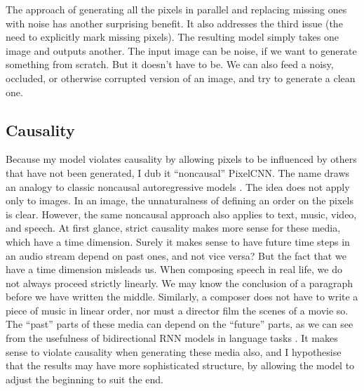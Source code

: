 \documentclass[10pt,a4paper]{article}
\newcommand{\nquote}[1]{``{#1}''}
\begin{document}
The approach of generating all the pixels in parallel and replacing missing ones with noise has another surprising benefit. It also addresses the third issue (the need to explicitly mark missing pixels). The resulting model simply takes one image and outputs another. The input image can be noise, if we want to generate something from scratch. But it doesn't have to be. We can also feed a noisy, occluded, or otherwise corrupted version of an image, and try to generate a clean one.

\subsection{Causality}

Because my model violates causality by allowing pixels to be influenced by others that have not been generated, I dub it \nquote{noncausal} PixelCNN. The name draws an analogy to classic noncausal autoregressive models \citep{noncausalimage2,noncausaleco2}. The idea does not apply only to images. In an image, the unnaturalness of defining an order on the pixels is clear. However, the same noncausal approach also applies to text, music, video, and speech. At first glance, strict causality makes more sense for these media, which have a time dimension. Surely it makes sense to have future time steps in an audio stream depend on past ones, and not vice versa? But the fact that we have a time dimension misleads us. When composing speech in real life, we do not always proceed strictly linearly. We may know the conclusion of a paragraph before we have written the middle. Similarly, a composer does not have to write a piece of music in linear order, nor must a director film the scenes of a movie so. The \nquote{past} parts of these media can depend on the \nquote{future} parts, as we can see from the usefulness of bidirectional RNN models in language tasks \citep{brnnuse1,brnnuse2,brnnuse3}. It makes sense to violate causality when generating these media also, and I hypothesise that the results may have more sophisticated structure, by allowing the model to adjust the beginning to suit the end.
\end{document}

